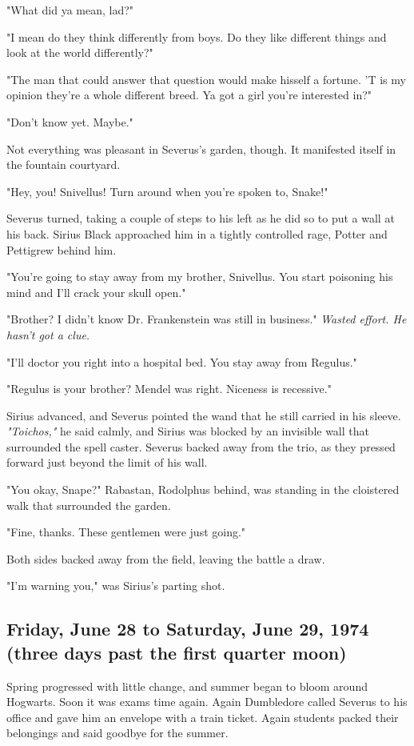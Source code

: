 "What did ya mean, lad?"

"I mean do they think differently from boys. Do they like different things and look at the world differently?"

"The man that could answer that question would make hisself a fortune. 'T is my opinion they're a whole different breed. Ya got a girl you're interested in?"

"Don't know yet. Maybe."

Not everything was pleasant in Severus's garden, though. It manifested itself in the fountain courtyard.

"Hey, you! Snivellus! Turn around when you're spoken to, Snake!"

Severus turned, taking a couple of steps to his left as he did so to put a wall at his back. Sirius Black approached him in a tightly controlled rage, Potter and Pettigrew behind him.

"You're going to stay away from my brother, Snivellus. You start poisoning his mind and I'll crack your skull open."

"Brother? I didn't know Dr. Frankenstein was still in business." \emph{Wasted effort. He hasn't got a clue.}

"I'll doctor you right into a hospital bed. You stay away from Regulus."

"Regulus is your brother? Mendel was right. Niceness is recessive."

Sirius advanced, and Severus pointed the wand that he still carried in his sleeve. \emph{"Toichos,"} he said calmly, and Sirius was blocked by an invisible wall that surrounded the spell caster. Severus backed away from the trio, as they pressed forward just beyond the limit of his wall.

"You okay, Snape?" Rabastan, Rodolphus behind, was standing in the cloistered walk that surrounded the garden.

"Fine, thanks. These gentlemen were just going."

Both sides backed away from the field, leaving the battle a draw.

"I'm warning you," was Sirius's parting shot.

\subsection{Friday, June 28 to Saturday, June 29, 1974 (three days past the first quarter moon)}

Spring progressed with little change, and summer began to bloom around Hogwarts. Soon it was exams time again. Again Dumbledore called Severus to his office and gave him an envelope with a train ticket. Again students packed their belongings and said goodbye for the summer.

